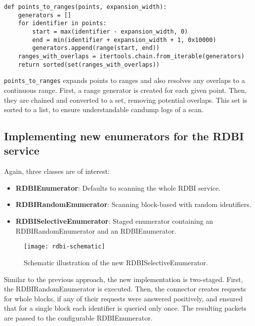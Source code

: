 \begin{samepage}
\begin{verbatim}
def points_to_ranges(points, expansion_width):
    generators = []
    for identifier in points:
        start = max(identifier - expansion_width, 0)
        end = min(identifier + expansion_width + 1, 0x10000)
        generators.append(range(start, end))
    ranges_with_overlaps = itertools.chain.from_iterable(generators)
    return sorted(set(ranges_with_overlaps))
\end{verbatim}
\end{samepage}

\texttt{points_to_ranges} expands points to ranges and also resolves any overlaps to a continuous range.
First, a range generator is created for each given point. Then, they are chained and converted to a set, removing potential overlaps. This set is sorted to a list, to ensure understandable candump logs of a scan.

\subsection{Implementing new enumerators for the RDBI service}

Again, three classes are of interest:

\begin{itemize}
    \item \textbf{RDBIEnumerator}: Defaults to scanning the whole RDBI service.
    \item \textbf{RDBIRandomEnumerator}: Scanning block-based with random identifiers.
    \item \textbf{RDBISelectiveEnumerator}: Staged enumerator containing an RDBIRandomEnumerator and an RDBIEnumerator.
\end{itemize}

\begin{figure}[h]
    \centering
    \texttt{[image: rdbi-schematic]}
    \caption{Schematic illustration of the new RDBISelectiveEnumerator.}
    \label{fig:rdbi-schematic}
\end{figure}

Similar to the previous approach, the new implementation is two-staged. First, the RDBIRandomEnumerator is executed. Then, the connector creates requests for whole blocks, if any of their requests were answered positively, and ensured that for a single block each identifier is queried only once. The resulting packets are passed to the configurable RDBIEnumerator.

